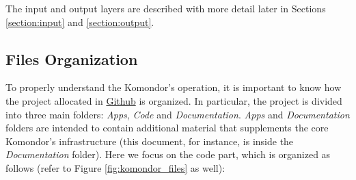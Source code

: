 \documentclass[a4paper]{article}
\begin{document}
	The input and output layers are described with more detail later in Sections \ref{section:input} and \ref{section:output}.
	
	\subsection{Files Organization}
	\label{section:files}		
	To properly understand the Komondor's operation, it is important to know how the project allocated in \href{https://github.com/wn-upf/Komondor}{Github} is organized. In particular, the project is divided into three main folders: \textit{Apps}, \textit{Code} and \textit{Documentation}. \textit{Apps} and \textit{Documentation} folders are intended to contain additional material that supplements the core Komondor's infrastructure (this document, for instance, is inside the \textit{Documentation} folder). Here we focus on the code part, which is organized as follows (refer to Figure \ref{fig:komondor_files} as well):
\end{document}
